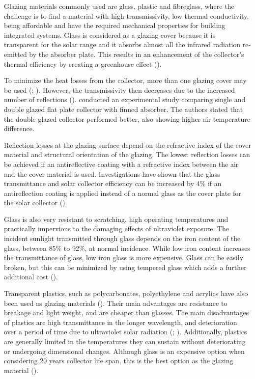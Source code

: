 Glazing materials commonly used are glass, plastic and fibreglass, where the challenge is to find a material with high transmissivity, low thermal conductivity, being affordable and have the required mechanical properties for building integrated systems. Glass is considered as a glazing cover because it is transparent for the solar range and it absorbs almost all the infrared radiation re-emitted by the absorber plate. This results in an enhancement of the collector's thermal efficiency by creating a greenhouse effect (\cite{Khoukhi2006}).

To minimize the heat losses from the collector, more than one glazing cover may be used (\cite{El-Sebaii2010}; \cite{Yeh2009}). However, the transmissivity then decreases due to the increased number of reflections (\cite{Michalopoulos1994}). \citet{Alta2010} conducted an experimental study comparing single and double glazed flat plate collector with finned absorber. The authors stated that the double glazed collector performed better, also showing higher air temperature difference.

Reflection losses at the glazing surface depend on the refractive index of the cover material and structural orientation of the glazing. The lowest reflection losses can be achieved if an antireflective coating with a refractive index between the air and the cover material is used. Investigations have shown that the glass transmittance and solar collector efficiency can be increased by 4\% if an antireflection coating is applied instead of a normal glass as the cover plate for the solar collector (\cite{Furbo2003}).  

Glass is also very resistant to scratching, high operating temperatures and practically impervious to  the damaging effects of ultraviolet exposure. The incident sunlight transmitted through glass depends  on the iron content of the glass, between 85\% to 92\%, at normal incidence. While low iron content increases the transmittance of glass, low iron glass is more expensive. Glass can be easily broken, but this can be minimized by using tempered glass which adds a further additional cost (\cite{Duffie2013}).

Transparent plastics, such as polycarbonates, polyethylene and acrylics have also been used as glazing materials (\cite{Koyuncu2006}). Their main advantages are resistance to breakage and light weight, and are cheaper than glasses. The main disadvantages of plastics are high transmittance in the longer wavelength, and deterioration over a period of time due to ultraviolet solar radiation (\cite{Goswami2015}; \cite{Duffie2013}). Additionally, plastics are generally limited in the temperatures they can sustain without deteriorating or undergoing dimensional changes. Although glass is an expensive option when considering 20 years collector life span, this is the best option as the glazing material (\cite{Shams2013}).

